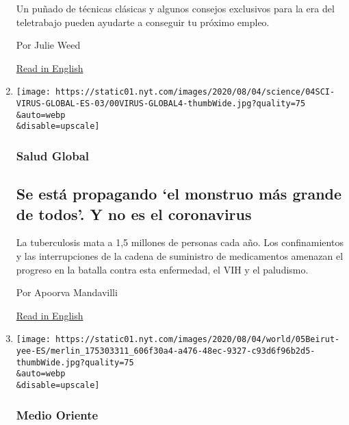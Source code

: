 \begin{enumerate}
  Un puñado de técnicas clásicas y algunos consejos exclusivos para la
  era del teletrabajo pueden ayudarte a conseguir tu próximo empleo.

  Por Julie Weed

  \href{https://www.nytimes.com/2020/08/03/business/online-job-interview-tips.html}{Read
  in English}
\item
  \href{/es/2020/08/05/espanol/ciencia-y-tecnologia/tuberculosis-malaria-coronavirus.html}{}

  \texttt{[image: https://static01.nyt.com/images/2020/08/04/science/04SCI-VIRUS-GLOBAL-ES-03/00VIRUS-GLOBAL4-thumbWide.jpg?quality=75\\\&auto=webp\\\&disable=upscale]}

  \hypertarget{salud-global}{%
  \subsubsection{Salud Global}\label{salud-global}}

  \hypertarget{se-estuxe1-propagando-el-monstruo-muxe1s-grande-de-todos-y-no-es-el-coronavirus}{%
  \subsection{Se está propagando `el monstruo más grande de todos'. Y no
  es el
  coronavirus}\label{se-estuxe1-propagando-el-monstruo-muxe1s-grande-de-todos-y-no-es-el-coronavirus}}

  La tuberculosis mata a 1,5 millones de personas cada año. Los
  confinamientos y las interrupciones de la cadena de suministro de
  medicamentos amenazan el progreso en la batalla contra esta
  enfermedad, el VIH y el paludismo.

  Por Apoorva Mandavilli

  \href{https://www.nytimes.com/2020/08/03/health/coronavirus-tuberculosis-aids-malaria.html}{Read
  in English}
\item
  \href{/es/2020/08/05/espanol/mundo/libano-explosion-beirut.html}{}

  \texttt{[image: https://static01.nyt.com/images/2020/08/04/world/05Beirut-yee-ES/merlin\_175303311\_606f30a4-a476-48ec-9327-c93d6f96b2d5-thumbWide.jpg?quality=75\\\&auto=webp\\\&disable=upscale]}

  \hypertarget{medio-oriente-1}{%
  \subsubsection{Medio Oriente}\label{medio-oriente-1}}


\end{enumerate}
